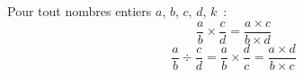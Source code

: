 Pour tout nombres entiers $a$, $b$, $c$, $d$, $k$~:
$$\dfrac ab\times\dfrac cd=\dfrac{a\times c}{b\times d}$$
$$\dfrac ab\div\dfrac cd=\dfrac ab\times\dfrac dc=\dfrac{a\times d}{b\times c}$$
